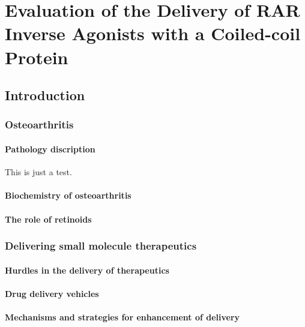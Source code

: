 \chapter{Evaluation of the Delivery of RAR Inverse Agonists with a Coiled-coil
Protein}

\begin{refsection}

\section{Introduction}

\subsection{Osteoarthritis}

\subsubsection{Pathology discription}

This is just a test.

\subsubsection{Biochemistry of osteoarthritis}

\subsubsection{The role of retinoids}

\subsection{Delivering small molecule therapeutics}

\subsubsection{Hurdles in the delivery of therapeutics}

\subsubsection{Drug delivery vehicles}

\subsubsection{Mechanisms and strategies for enhancement of delivery}


\end{refsection}
